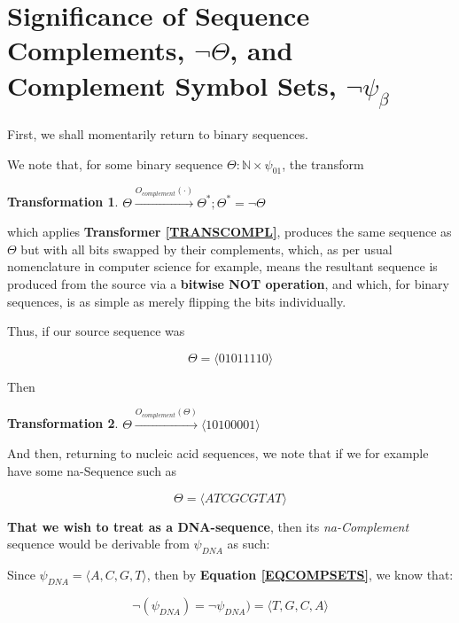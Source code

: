 \documentclass[a4paper, 18pt]{book} %
\newtheorem{trans}{Transformation}
\begin{document}
\section{Significance of Sequence Complements, $\lnot\Theta$, and Complement Symbol Sets, $\lnot\psi_\beta$}
\label{SECSIGCOMPLE}

First, we shall momentarily return to binary sequences. 

We note that, for some binary sequence $\Theta: \mathbb{N} \times \psi_{01}$, the transform

\begin{trans}
$\Theta \xrightarrow{O_{complement}(\cdot)} \Theta^*; \Theta^* = \lnot\Theta$
\end{trans}

which applies \textbf{Transformer \ref{TRANSCOMPL}}, produces the same sequence as $\Theta$ but with all bits swapped by their complements, which, as per usual nomenclature in computer science for example, means the resultant sequence is produced from the source via a \textbf{bitwise NOT operation}, and which, for binary sequences, is as simple as merely flipping the bits individually.

Thus, if our source sequence was 

\begin{equation}
\Theta = \langle 0 1 0 1 1 1 1 0 \rangle
\end{equation}

Then 

\begin{trans}
$\Theta \xrightarrow{O_{complement}(\Theta)}  \langle 1 0 1 0 0 0 0 1 \rangle$
\end{trans}

And then, returning to nucleic acid sequences, we note that if we for example have some na-Sequence such as 

\begin{equation}
\label{SEQATC}
\Theta = \langle A T C G C G T A T \rangle
\end{equation}

\textbf{That we wish to treat as a DNA-sequence}, then its \textit{na-Complement} sequence would be derivable from $\psi_{DNA}$ as such:

Since $\psi_{DNA} = \langle A, C, G, T \rangle$, then by \textbf{Equation \ref{EQCOMPSETS}}, we know that:

\begin{equation}
\lnot(\psi_{DNA}) = \lnot\psi_{DNA}) = \langle T, G, C, A \rangle
\end{equation}
\end{document}
